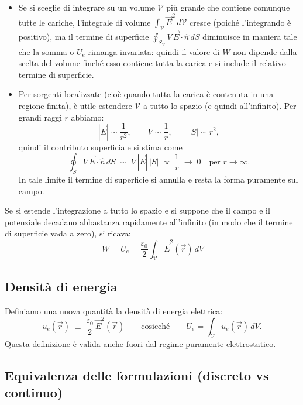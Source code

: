\documentclass{book}
\begin{document}
\begin{itemize}
\item Se si sceglie di integrare su un volume \(\mathcal V\) più grande che contiene comunque tutte le cariche, l'integrale di volume \(\int_{\mathcal V}\vec E^2\,d\mathcal V\) cresce (poiché l'integrando è positivo), ma il termine di superficie \(\oint_{S_{\mathcal V}} V\,\vec E\cdot\hat n\,dS\) diminuisce in maniera tale che la somma o $U_e$ rimanga invariata: quindi il valore di \(W\) non dipende dalla scelta del volume finché esso contiene tutta la carica e si include il relativo termine di superficie.
\item Per sorgenti localizzate (cioè quando tutta la carica è contenuta in una regione finita), è utile estendere \(\mathcal V\) a tutto lo spazio (e quindi all'infinito). Per grandi raggi \(r\) abbiamo:
  \[
  |\vec E|\sim \frac{1}{r^2},\qquad V\sim\frac{1}{r},\qquad |S|\sim r^2,
  \]
  quindi il contributo superficiale si stima come
  \[
  \oint_{S} V\,\vec E\cdot\hat n\,dS \;\sim\; V \,|\vec E|\,|S| \;\propto\; \frac{1}{r}\;\longrightarrow\; 0
  \quad\text{per }r\to\infty.
  \]
 In tale limite il termine di superficie si annulla e resta la forma puramente sul campo.
\end{itemize}

Se si estende l'integrazione a tutto lo spazio e si suppone che il campo e il potenziale decadano abbastanza rapidamente all'infinito (in modo che il termine di superficie vada a zero), si ricava:
\[
\boxed{\,W = U_e = \frac{\varepsilon_0}{2}\int_{\mathcal{V}}\vec E^2(\vec r)\,dV}
\]

\subsection*{Densità di energia}

Definiamo una nuova quantità la densità di energia elettrica:
\[
u_e(\vec r)\;\equiv\; \frac{\varepsilon_0}{2}\,\vec E^2(\vec r)
\qquad\text{cosicché}\qquad
U_e=\int_{\mathcal{V}}u_e(\vec r)\,dV.
\]
Questa definizione è valida anche fuori dal regime puramente elettrostatico.

\subsection*{Equivalenza delle formulazioni (discreto vs continuo)} 
\end{document}
